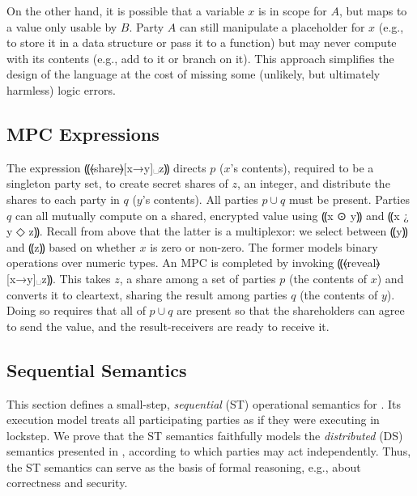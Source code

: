On the other hand, it is possible that a variable $x$ is in scope for
$A$, but maps to a value only usable by $B$. Party $A$ can
still manipulate a placeholder for $x$ (e.g., to store it in a
data structure or pass it to a function) but may never compute with its
contents (e.g., add to it or branch on it). This approach
simplifies the design of the language at the cost of missing some
(unlikely, but ultimately harmless) logic errors.

\subsection{MPC Expressions}
\label{subsec:mpc-design-mpc}

The \mpc expression ⸨⦑share⦒[x→y]␣z⸩ directs $p$ ($x$'s contents),
required to be a singleton party set, to create secret shares of $z$,
an integer, and distribute the shares to each party in
$q$ ($y$'s contents). All parties $p \cup q$ must be present.
Parties $q$ can all mutually compute on a shared, encrypted value
using ⸨x {⊙} y⸩ and ⸨x {¿} y {◇} z⸩.  Recall from above that the latter is a
multiplexor: we select between ⸨y⸩ and ⸨z⸩ based on whether $x$ is zero or
non-zero. The former models binary operations over numeric types.
An MPC is completed by invoking ⸨⦑reveal⦒[x→y]␣z⸩. This takes $z$, a share
among a set of parties $p$ (the contents of $x$) and converts it to cleartext,
sharing the result among parties $q$ (the contents of $y$). Doing so requires that all of
$p \cup q$ are present so that the shareholders can agree to send the value,
and the result-receivers are ready to receive it.

\subsection{Sequential Semantics}
\label{subsec:mpc-design-seq}

This section defines a small-step, \emph{sequential} (ST)
operational semantics for \mpc. Its execution model treats all
participating parties as if they were executing in lockstep.
We prove that the ST semantics faithfully models the \emph{distributed} (DS)
semantics presented in , according to which parties may act
independently. Thus, the ST semantics can serve as the basis of \mpc formal reasoning,
e.g., about correctness and security.


